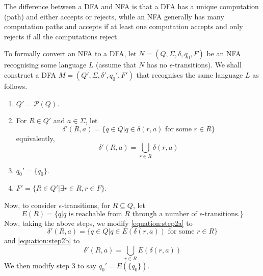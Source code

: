 The difference between a DFA and NFA is that a DFA has a unique computation (path) and either accepts or rejects, while an NFA generally has many computation paths and accepts if at least one computation accepts and only rejects if all the computations reject.

{To formally convert an NFA to a DFA, let \(N = (Q, \Sigma, \delta, q_0, F)\) be an NFA recognising some language \(L\) (assume that \(N\) has no \(\epsilon\)-transitions). We shall construct a DFA \(M = (Q', \Sigma, \delta', q_0', F')\) that recognises the same language \(L\) as follows.
\begin{enumerate}
    \item \(Q' = \mathscr{P}(Q)\).
    \item For \(R \in Q'\) and \(a \in \Sigma\), let
    \begin{equation}\label{equation:step2a}
        \delta'(R,a) = \{q \in Q | q \in \delta(r,a) \text{ for some } r \in R\}
    \end{equation}
    equivalently,
    \begin{equation}\label{equation:step2b}
        \delta'(R,a) = \bigcup_{r \in R} \delta(r,a)
    \end{equation}
    \item \(q_0' = \{q_0\}\).
    \item \(F' = \{R \in Q' | \exists r \in R, r \in F\}\).
\end{enumerate}
Now, to consider \(\epsilon\)-transitions, for \(R \subseteq Q\), let 
\begin{equation}
    E(R) = \{q | q \text{ is reachable from } R \text{ through a number of } \epsilon \text{-transitions.}\}
\end{equation}
Now, taking the above steps, we modify \eqref{equation:step2a} to
\begin{equation}
    \delta'(R,a) = \{q \in Q | q \in E(\delta(r,a)) \text{ for some } r \in R\}
\end{equation}
and \eqref{equation:step2b} to
\begin{equation}
    \delta'(R,a) = \bigcup_{r \in R} E(\delta(r,a))
\end{equation}
We then modify step 3 to say \(q_0' = E(\{q_0\})\).}


